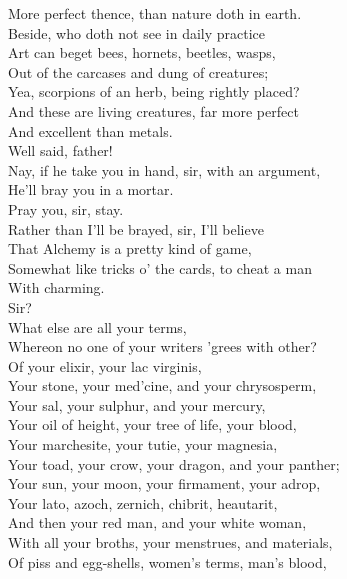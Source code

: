 \documentclass{memoir}
\begin{document}
\begin{drama*}
 More perfect thence, than nature doth in earth.\\
 Beside, who doth not see in daily practice\\
 Art can beget bees, hornets, beetles, wasps,\\
 Out of the carcases and dung of creatures;\\
 Yea, scorpions of an herb, being rightly placed?\\
 And these are living creatures, far more perfect\\
 And excellent than metals.\\
\mammonspeaks {} Well said, father!\\
 Nay, if he take you in hand, sir, with an argument,\\
 He'll bray you in a mortar.\\
\surlyspeaks {} Pray you, sir, stay.\\
 Rather than I'll be brayed, sir, I'll believe\\
 That Alchemy is a pretty kind of game,\\
 Somewhat like tricks o' the cards, to cheat a man\\
 With charming.\\
\subtlespeaks {} Sir?\\
\surlyspeaks {} What else are all your terms,\\
 Whereon no one of your writers 'grees with other?\\
 Of your elixir, your lac virginis,\\
 Your stone, your med'cine, and your chrysosperm,\\
 Your sal, your sulphur, and your mercury,\\
 Your oil of height, your tree of life, your blood,\\
 Your marchesite, your tutie, your magnesia,\\
 Your toad, your crow, your dragon, and your panther;\\
 Your sun, your moon, your firmament, your adrop,\\
 Your lato, azoch, zernich, chibrit, heautarit,\\
 And then your red man, and your white woman,\\
 With all your broths, your menstrues, and materials,\\
 Of piss and egg-shells, women's terms, man's blood,\\

\end{drama*}
\end{document}
